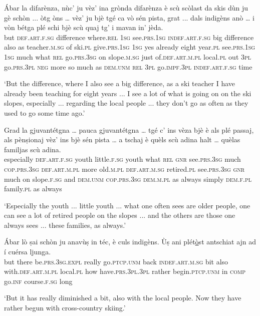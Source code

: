 \begin{linenumbers}
	\gll Ábar la difarènza, nùc’ ju vèz’ ina grònda difarènza è scù scòlast da skis dùn ju gè schòn ... òtg òns … vèz’ ju bjè tgé ca vò sén pista, grat ... dals indigèns anò … i vòn bétga plé schi bjè scù quaj tg’ i mavan in' jèda.   \\
	but \textsc{def.art.f.sg} difference where.\textsc{rel} \textsc{1sg} see.\textsc{prs.1sg} \textsc{indef.art.f.sg} big difference also as teacher.\textsc{m.sg} of ski.\textsc{pl} give.\textsc{prs.1sg} \textsc{1sg} yes already {} eight year.\textsc{pl} {} see.\textsc{prs.1sg} \textsc{1sg} much what \textsc{rel} go.\textsc{prs.3sg} on slope.\textsc{m.sg} just {} of.\textsc{def.art.m.pl} local.\textsc{pl} out {} \textsc{3pl} go.\textsc{prs.3pl} \textsc{neg} more so much as \textsc{dem.unm} \textsc{rel} \textsc{3pl} go.\textsc{impf.3pl} \textsc{indef.art.f.sg} time \\
\end{linenumbers}
\medskip
\glt `But the difference, where I also see a big difference, as a ski teacher I have already been teaching for eight years ... I see a lot of what is going on on the ski slopes, especially ... regarding the local people ... they don't go as often as they used to go some time ago.'
\medskip

\begin{linenumbers}
	\gll Grad la gjuvantétgna … pauca gjuvantétgna … tgé c’ ins vèza bjè è als plé passaj, als pènṣionaj vèz’ ins bjè sén pista … a tschaj è quèls scù adina halt … quèlas familjas scù adina.\\
	especially \textsc{def.art.f.sg} youth {} little.\textsc{f.sg} youth {} what \textsc{rel} \textsc{gnr} see.\textsc{prs.3sg} much \textsc{cop.prs.3sg} \textsc{def.art.m.pl} more old.\textsc{m.pl} \textsc{def.art.m.sg} retired.\textsc{pl} see.\textsc{prs.3sg} \textsc{gnr} much on slope.\textsc{f.sg} {} and \textsc{dem.unm} \textsc{cop.prs.3sg} \textsc{dem.m.pl} as always simply {} \textsc{dem.f.pl} family.\textsc{pl} as always\\
\end{linenumbers}
\medskip
\glt `Especially the youth ... little youth ... what one often sees are older people, one can see a lot of retired people on the slopes ... and the others are those one always sees ... these families, as always.'
\medskip

\begin{linenumbers}
	\gll Ábar lò ṣai schòn ju anavùṣ in téc, è culs indigèns. Ùṣ ani plét\underline{ò}st antschiat ajn ad í cuérsa ljunga.\\
	but there be.\textsc{prs.3sg.expl} really go.\textsc{ptcp.unm} back \textsc{indef.art.m.sg} bit also with.\textsc{def.art.m.pl} local.\textsc{pl} how have.\textsc{prs.3pl.3pl} rather begin\textsc{.ptcp.unm} in \textsc{comp} go.\textsc{inf} course.\textsc{f.sg} long\\
\end{linenumbers}
\medskip
\glt `But it has really diminished a bit, also with the local people. Now they have rather begun with cross-country skiing.'
\medskip

